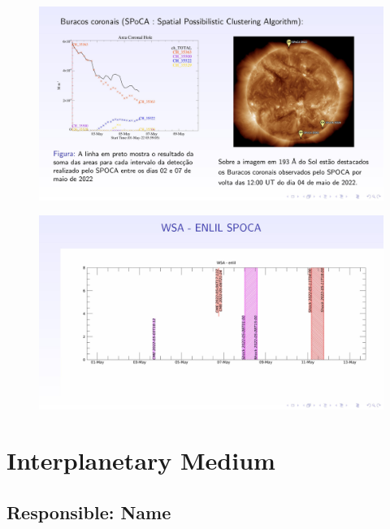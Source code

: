 \documentclass[a4paper, 10pt]{article}
\begin{document}
    \begin{figure}[H]
        \centering
        \includegraphics[width=14cm]{./figures/en_outfileSun_0.jpg}
    \end{figure} 
 

    
    \begin{figure}[H]
        \centering
        \includegraphics[width=14cm]{./figures/en_outfileSun_1.jpg}
    \end{figure} 
 

    \section{Interplanetary Medium} 
 \subsection{Responsible: Name} 
 
\end{document}

